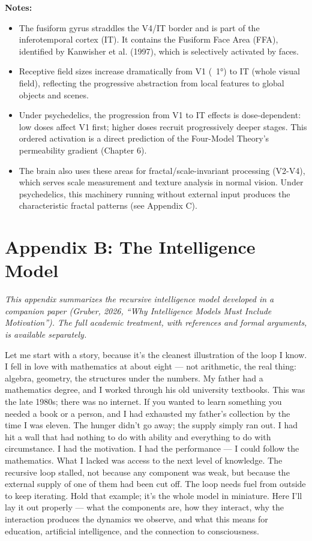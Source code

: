 \documentclass[11pt, twoside, openright]{book}
\begin{document}
\textbf{Notes:}
\begin{itemize}
  \item The fusiform gyrus straddles the V4/IT border and is part of the inferotemporal cortex (IT). It contains the Fusiform Face Area (FFA), identified by Kanwisher et al. (1997), which is selectively activated by faces.
  \item Receptive field sizes increase dramatically from V1 (~1°) to IT (whole visual field), reflecting the progressive abstraction from local features to global objects and scenes.
  \item Under psychedelics, the progression from V1 to IT effects is dose-dependent: low doses affect V1 first; higher doses recruit progressively deeper stages. This ordered activation is a direct prediction of the Four-Model Theory's permeability gradient (Chapter 6).
  \item The brain also uses these areas for fractal/scale-invariant processing (V2-V4), which serves scale measurement and texture analysis in normal vision. Under psychedelics, this machinery running without external input produces the characteristic fractal patterns (see Appendix C).
\end{itemize}


\chapter*{Appendix B: The Intelligence Model}

\textit{This appendix summarizes the recursive intelligence model developed in a companion paper (Gruber, 2026, ``Why Intelligence Models Must Include Motivation''). The full academic treatment, with references and formal arguments, is available separately.}

Let me start with a story, because it's the cleanest illustration of the loop I know. I fell in love with mathematics at about eight --- not arithmetic, the real thing: algebra, geometry, the structures under the numbers. My father had a mathematics degree, and I worked through his old university textbooks. This was the late 1980s; there was no internet. If you wanted to learn something you needed a book or a person, and I had exhausted my father's collection by the time I was eleven. The hunger didn't go away; the supply simply ran out. I had hit a wall that had nothing to do with ability and everything to do with circumstance. I had the motivation. I had the performance --- I could follow the mathematics. What I lacked was access to the next level of knowledge. The recursive loop stalled, not because any component was weak, but because the external supply of one of them had been cut off. The loop needs fuel from outside to keep iterating. Hold that example; it's the whole model in miniature. Here I'll lay it out properly --- what the components are, how they interact, why the interaction produces the dynamics we observe, and what this means for education, artificial intelligence, and the connection to consciousness.
\end{document}
